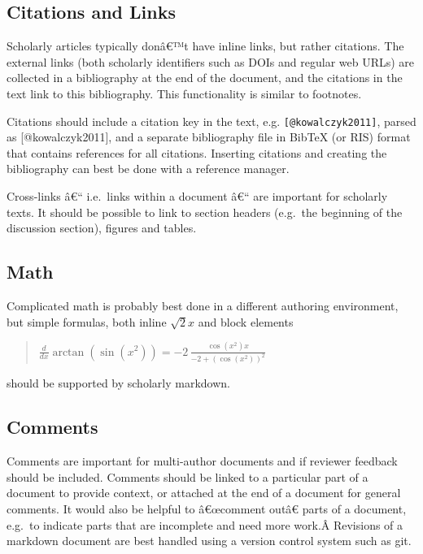 \documentclass[]{article}
\newcommand{\euro}{€}
\begin{document}
\subsection{Citations and Links}\label{citations-and-links}

Scholarly articles typically donâ\euro{}™t have inline links, but rather
citations. The external links (both scholarly identifiers such as DOIs
and regular web URLs) are collected in a bibliography at the end of the
document, and the citations in the text link to this bibliography. This
functionality is similar to footnotes.

Citations should include a citation key in the text, e.g.
\texttt{{[}@kowalczyk2011{]}}, parsed as {[}@kowalczyk2011{]}, and a
separate bibliography file in BibTeX (or RIS) format that contains
references for all citations. Inserting citations and creating the
bibliography can best be done with a reference manager.

Cross-links â\euro{}`` i.e.~links within a document â\euro{}`` are
important for scholarly texts. It should be possible to link to section
headers (e.g.~the beginning of the discussion section), figures and
tables.

\subsection{Math}\label{math}

Complicated math is probably best done in a different authoring
environment, but simple formulas, both inline $\sqrt2x$ and block
elements

\begin{quote}
${\frac {d}{dx}}\arctan(\sin({x}^{2}))=-2\,{\frac {\cos({x}^{2})x}{-2+\left (\cos({x}^{2})\right )^{2}}}$
\end{quote}

should be supported by scholarly markdown.

\subsection{Comments}\label{comments}

Comments are important for multi-author documents and if reviewer
feedback should be included. Comments should be linked to a particular
part of a document to provide context, or attached at the end of a
document for general comments. It would also be helpful to
â\euro{}œcomment outâ\euro{} parts of a document, e.g.~to indicate
parts that are incomplete and need more work.Â Revisions of a markdown
document are best handled using a version control system such as git.
\end{document}

